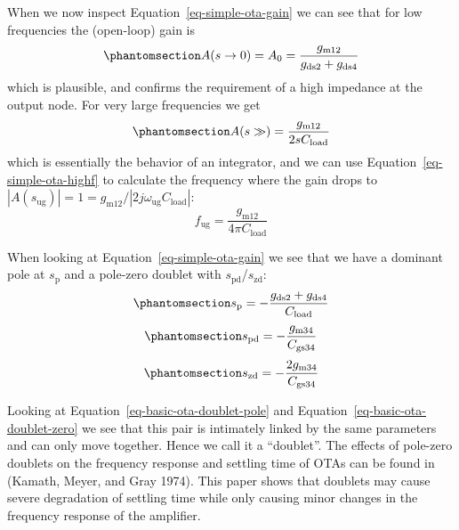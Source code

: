 \documentclass[
  a4paper,
  DIV=11,
  numbers=noendperiod]{scrartcl}
\begin{document}
When we now inspect Equation~\ref{eq-simple-ota-gain} we can see that
for low frequencies the (open-loop) gain is
\begin{equation}\phantomsection\label{eq-simple-ota-gain-dc}{
A(s \rightarrow 0) = A_0 = \frac{g_\mathrm{m12}}{g_\mathrm{ds2} + g_\mathrm{ds4}}
}\end{equation} which is plausible, and confirms the requirement of a
high impedance at the output node. For very large frequencies we get
\begin{equation}\phantomsection\label{eq-simple-ota-highf}{
A (s \gg) = \frac{g_\mathrm{m12}}{2 s C_\mathrm{load}}
}\end{equation} which is essentially the behavior of an integrator, and
we can use Equation~\ref{eq-simple-ota-highf} to calculate the frequency
where the gain drops to
\(|A(s_\mathrm{ug})| = 1 = g_\mathrm{m12}/|2 j \omega_\mathrm{ug} C_\mathrm{load}|\):
\[
f_\mathrm{ug} = \frac{g_\mathrm{m12}}{4 \pi C_\mathrm{load}}
\]

When looking at Equation~\ref{eq-simple-ota-gain} we see that we have a
dominant pole at \(s_\mathrm{p}\) and a pole-zero doublet with
\(s_\mathrm{pd}\)/\(s_\mathrm{zd}\):
\begin{equation}\phantomsection\label{eq-basic-ota-dominant-pole}{
s_\mathrm{p} = -\frac{g_\mathrm{ds2} + g_\mathrm{ds4}}{C_\mathrm{load}}
}\end{equation}
\begin{equation}\phantomsection\label{eq-basic-ota-doublet-pole}{
s_\mathrm{pd} = -\frac{g_\mathrm{m34}}{C_\mathrm{gs34}}
}\end{equation}
\begin{equation}\phantomsection\label{eq-basic-ota-doublet-zero}{
s_\mathrm{zd} = -\frac{2 g_\mathrm{m34}}{C_\mathrm{gs34}}
}\end{equation}

\begin{tcolorbox}[enhanced jigsaw, colframe=quarto-callout-note-color-frame, breakable, title=\textcolor{quarto-callout-note-color}{\faInfo}\hspace{0.5em}{Why a Pole-Zero Doublet?}, titlerule=0mm, coltitle=black, arc=.35mm, colback=white, opacitybacktitle=0.6, leftrule=.75mm, toptitle=1mm, left=2mm, bottomrule=.15mm, bottomtitle=1mm, rightrule=.15mm, opacityback=0, toprule=.15mm, colbacktitle=quarto-callout-note-color!10!white]

Looking at Equation~\ref{eq-basic-ota-doublet-pole} and
Equation~\ref{eq-basic-ota-doublet-zero} we see that this pair is
intimately linked by the same parameters and can only move together.
Hence we call it a ``doublet''. The effects of pole-zero doublets on the
frequency response and settling time of OTAs can be found in (Kamath,
Meyer, and Gray 1974). This paper shows that doublets may cause severe
degradation of settling time while only causing minor changes in the
frequency response of the amplifier.

\end{tcolorbox}
\end{document}
